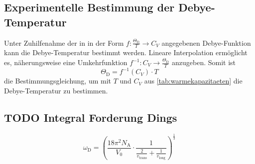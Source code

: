 \subsection{Experimentelle Bestimmung der Debye-Temperatur}
Unter Zuhilfenahme der in \cite[Tabelle 1]{versuchsanleitung}
in der Form $f: \frac{\Theta_\text{D}}{T} \longrightarrow C_V$
angegebenen Debye-Funktion
kann die Debye-Temperatur bestimmt werden.
Lineare Interpolation ermöglicht es, näherungsweise eine Umkehrfunktion
$f^{-1}: C_V \longrightarrow \frac{\Theta_\text{D}}{T}$
anzugeben.
Somit ist
\[
    \Theta_\text{D} = f^{-1}(C_V) · T
\]
die Bestimmungsgleichung, um mit $T$ und $C_V$ aus \autoref{tab:warmekapazitaeten} die Debye-Temperatur zu bestimmen.


\subsection{TODO Integral Forderung Dings}
\begin{equation*}
    \omega_\text{D}
    = \left(
        \frac{18 \pi^2 N_\text{A}}{V_0} · \frac{1}{\frac{2}{v_\text{trans}} + \frac{1}{v_\text{long}}}
    \right)^{\frac{1}{3}}
\end{equation*}

